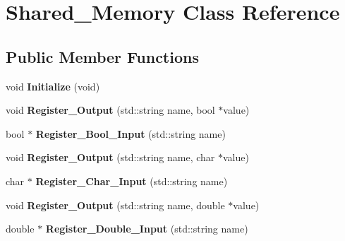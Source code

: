\hypertarget{class_shared___memory}{}\section{Shared\+\_\+\+Memory Class Reference}
\label{class_shared___memory}
\subsection*{Public Member Functions}
\begin{DoxyCompactItemize}
\item 
\mbox{\label{class_shared___memory_aa056d584c6ff778d0e3e6a49bae982e1}} 
void {\bfseries Initialize} (void)
\item 
\mbox{\label{class_shared___memory_ac1a0a9ba0b7ea383dc937f5e01ce301c}} 
void {\bfseries Register\+\_\+\+Output} (std\+::string name, bool $\ast$value)
\item 
\mbox{\label{class_shared___memory_a1e89435b0ae24bf9ea8dbececf7bf01a}} 
bool $\ast$ {\bfseries Register\+\_\+\+Bool\+\_\+\+Input} (std\+::string name)
\item 
\mbox{\label{class_shared___memory_af1354075089c0e0feeb817a528ea954c}} 
void {\bfseries Register\+\_\+\+Output} (std\+::string name, char $\ast$value)
\item 
\mbox{\label{class_shared___memory_a9025a9c7b5340e2018c2b0787600567c}} 
char $\ast$ {\bfseries Register\+\_\+\+Char\+\_\+\+Input} (std\+::string name)
\item 
\mbox{\label{class_shared___memory_ad93f804cfa69d53394f65590d318f8f4}} 
void {\bfseries Register\+\_\+\+Output} (std\+::string name, double $\ast$value)
\item 
\mbox{\label{class_shared___memory_afd0446ab3118d9f1582da04296809a7d}} 
double $\ast$ {\bfseries Register\+\_\+\+Double\+\_\+\+Input} (std\+::string name)
\item 
\mbox{\label{class_shared___memory_ae91ffb0fa801d256e45f64e48ba173f2}} 

\end{DoxyCompactItemize}
